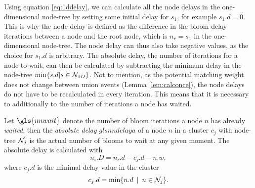 Using equation \eqref{eq:1ddelay}, we can calculate all the node delays in the one-dimensional node-tree by setting some initial delay for $s_1$, for example $s_1.d=0$. This is why the node delay is defined as the difference in the bloom delay iterations between a node and the root node, which is $n_r=s_1$ in the one-dimensional node-tree. The node delay can thus also take negative values, as the choice for $s_1.d$ is arbitrary. The absolute delay, the number of iterations for a node to wait, can then be calculated by subtracting the minimum delay in the node-tree $\min \{s.d | s \in \mathcal{N}_{1D}\}$. Not to mention, as the potential matching weight does not change between union events (Lemma \ref{lem:calconce}), the node delays do not have to be recalculated in every iteration. This means that it is necessary to additionally to the number of iterations a node has waited.
\begin{definition}\label{def:absolutedelay}
  Let $\gls{nnwait}$ denote the number of bloom iterations a node $n$ has already \emph{waited}, then the \emph{absolute delay} $gls{nndelaya}$ of a node $n$ in a cluster $c_j$ with node-tree $\mathcal{N}_j$ is the actual number of blooms to wait at any given moment. The absolute delay is calculated with
  \begin{equation}\label{eq:absulutedelay}
    n_i.D = n_i.d - c_j.d - n.w, 
  \end{equation}
  where $c_j.d$ is the minimal delay value in the cluster
  \begin{equation}\label{eq:cd}
    c_j.d = \min \{n.d \hspace{.5em} | \hspace{.5em} n\in \mathcal{N}_j\}.
  \end{equation}
\end{definition}
